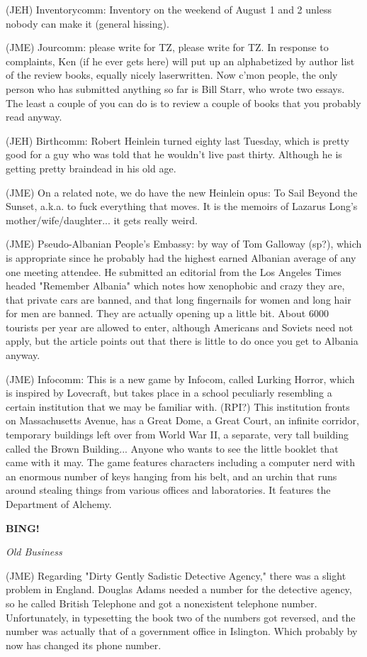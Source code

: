 \documentclass[12pt]{article}
\newcommand{\bing}{{\bf BING!} }
\newcommand{\goto}[1]{\bing \vskip 12pt \centerline{{\em{#1}}}}
\begin{document}
(JEH) Inventorycomm: Inventory on the weekend of August 1 and 2 unless nobody can make it (general hissing).

(JME) Jourcomm: please write for TZ, please write for TZ. In response to complaints, Ken (if he ever gets here) will put up an alphabetized by author list of the review books, equally nicely laserwritten. Now c'mon people, the only person who has submitted anything so far is Bill Starr, who wrote two essays. The least a couple of you can do is to review a couple of books that you probably read anyway.

(JEH) Birthcomm: Robert Heinlein turned eighty last Tuesday, which is pretty good for a guy who was told that he wouldn't live past thirty. Although he is getting pretty braindead in his old age.

(JME) On a related note, we do have the new Heinlein opus: To Sail Beyond the Sunset, a.k.a. to fuck everything that moves. It is the memoirs of Lazarus Long's mother/wife/daughter... it gets really weird.

(JME) Pseudo-Albanian People's Embassy: by way of Tom Galloway (sp?), which is appropriate since he probably had the highest earned Albanian average of any one meeting attendee. He submitted an editorial from the Los Angeles Times headed "Remember Albania" which notes how xenophobic and crazy they are, that private cars are banned, and that long fingernails for women and long hair for men are banned. They are actually opening up a little bit. About 6000 tourists per year are allowed to enter, although Americans and Soviets need not apply, but the article points out that there is little to do once you get to Albania anyway.

(JME) Infocomm: This is a new game by Infocom, called Lurking Horror, which is inspired by Lovecraft, but takes place in a school peculiarly resembling a certain institution that we may be familiar with. (RPI?) This institution fronts on Massachusetts Avenue, has a Great Dome, a Great Court, an infinite corridor, temporary buildings left over from World War II, a separate, very tall building called the Brown Building... Anyone who wants to see the little booklet that came with it may. The game features characters including a computer nerd with an enormous number of keys hanging from his belt, and an urchin that runs around stealing things from various offices and laboratories. It features the Department of Alchemy.

\goto{Old Business}

(JME) Regarding "Dirty Gently Sadistic Detective Agency," there was a slight problem in England. Douglas Adams needed a number for the detective agency, so he called British Telephone and got a nonexistent telephone number. Unfortunately, in typesetting the book two of the numbers got reversed, and the number was actually that of a government office in Islington. Which probably by now has changed its phone number.
\end{document}
